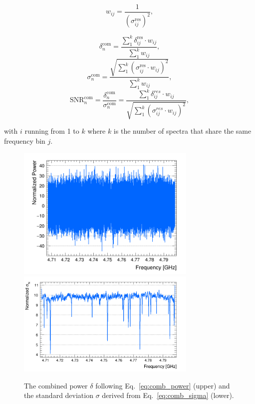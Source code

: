 \begin{equation}
    \label{eq:weight}
    {w_{ij}} = \frac{1}{(\sigma_{ij}^\text{res})^{2}},
\end{equation}

\begin{equation}
    \label{eq:comb_power}
    \delta_{n}^\text{com} = \frac{ \sum_{1}^{k}\delta_{ij}^\text{res} \cdot {w_{ij}}}{\sum_{1}^{k} {w_{ij}}},
\end{equation}
\begin{equation}
    \label{eq:comb_sigma}
    \sigma_{n}^\text{com} = \frac{ \sqrt{\sum_{1}^{k}(\sigma_{ij}^\text{res} \cdot {w_{ij}})^2}}{\sum_{1}^{k} {w_{ij}}},
\end{equation}
\begin{equation}
    \label{eq:comb_snr}
    \text{SNR}_{n}^\text{com} = \frac{\delta^\text{com}_{n}}{\sigma^\text{com}_{n}}= \frac{\sum_{1}^{k}\delta_{ij}^{res} \cdot {w_{ij}}}{ \sqrt{\sum_{1}^{k}(\sigma_{ij}^{res} \cdot {w_{ij}})^2}},
\end{equation}

with $i$ running from 1 to $k$ where $k$ is the 
number of spectra that share the same frequency bin $j$.

\begin{figure}[h]
    \centering
    \includegraphics[width=8.6cm]{figures/Power_CombSpectrum_AxionRun_AllSteps_Rescan_SG4_W201_LqWeight.png}
    \includegraphics[width=8.6cm]{figures/Sigma_CombSpectrum_AxionRun_AllSteps_Rescan_SG4_W201_LqWeight.png}
    \caption{The combined power $\delta$ following Eq.~\eqref{eq:comb_power} 
(upper) and the standard deviation $\sigma$ derived from 
Eq.~\eqref{eq:comb_sigma} (lower).}
    \label{fig:power_sigma_comb}
\end{figure}


